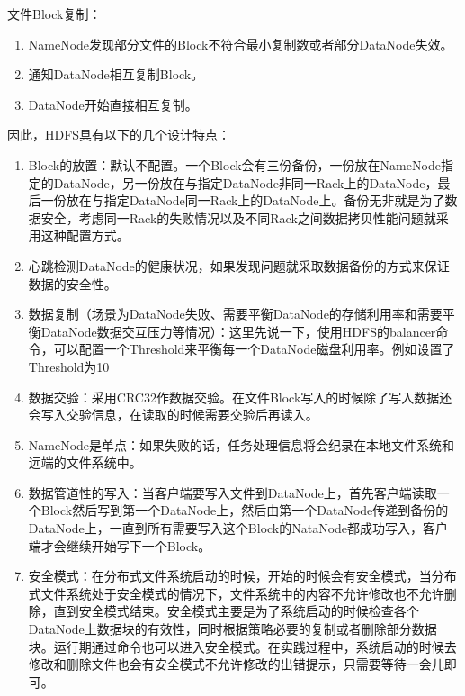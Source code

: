文件Block复制：

\begin{enumerate}
\item NameNode发现部分文件的Block不符合最小复制数或者部分DataNode失效。
\item 通知DataNode相互复制Block。
\item DataNode开始直接相互复制。
\end{enumerate}

因此，HDFS具有以下的几个设计特点：

\begin{enumerate}
\item Block的放置：默认不配置。一个Block会有三份备份，一份放在NameNode指定的DataNode，另一份放在与指定DataNode非同一Rack上的DataNode，最后一份放在与指定DataNode同一Rack上的DataNode上。备份无非就是为了数据安全，考虑同一Rack的失败情况以及不同Rack之间数据拷贝性能问题就采用这种配置方式。
\item 心跳检测DataNode的健康状况，如果发现问题就采取数据备份的方式来保证数据的安全性。
\item 数据复制（场景为DataNode失败、需要平衡DataNode的存储利用率和需要平衡DataNode数据交互压力等情况）：这里先说一下，使用HDFS的balancer命令，可以配置一个Threshold来平衡每一个DataNode磁盘利用率。例如设置了Threshold为10%
\item 数据交验：采用CRC32作数据交验。在文件Block写入的时候除了写入数据还会写入交验信息，在读取的时候需要交验后再读入。
\item NameNode是单点：如果失败的话，任务处理信息将会纪录在本地文件系统和远端的文件系统中。
\item 数据管道性的写入：当客户端要写入文件到DataNode上，首先客户端读取一个Block然后写到第一个DataNode上，然后由第一个DataNode传递到备份的DataNode上，一直到所有需要写入这个Block的NataNode都成功写入，客户端才会继续开始写下一个Block。
\item 安全模式：在分布式文件系统启动的时候，开始的时候会有安全模式，当分布式文件系统处于安全模式的情况下，文件系统中的内容不允许修改也不允许删除，直到安全模式结束。安全模式主要是为了系统启动的时候检查各个DataNode上数据块的有效性，同时根据策略必要的复制或者删除部分数据块。运行期通过命令也可以进入安全模式。在实践过程中，系统启动的时候去修改和删除文件也会有安全模式不允许修改的出错提示，只需要等待一会儿即可。
\end{enumerate}

